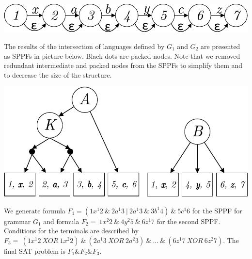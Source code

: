 \includegraphics[scale=.54]{./pic/trace2.pdf}

The results of the intersection of languages defined by $G_1$ and $G_2$ are presented as SPPFs in picture
below. Black dots are packed nodes. Note that we removed redundant intermediate and packed nodes from the 
SPPFs to simplify them and to decrease the size of the structure.

\includegraphics[scale=.6]{./pic/trees2.pdf}


We generate formula $F_1 = (1 x^1 2\ \&\ 2 a^1 3\ |\ 2 a^1 3\ \&\ 3 b^1 4)\ \&\ 5 c^1 6$  %
for the SPPF for grammar $G_1$
and formula $F_2 = \ 1 x^2 2\ \&\ 4 y^2 5\ \&\ 6 z^1 7$ %
for the second SPPF. Conditions for the 
terminals are described by $F_3 = \ (1 x^1 2\ XOR\ 1 x^2 2)\ \&\ (2 a^1 3\ XOR\ 2 a^2 3)\ \&\ ...\ \&\ (6 z^1 7\ XOR\ 6 z^2 7)$.
The final SAT problem is $F_1\&F_2\&F_3$.
